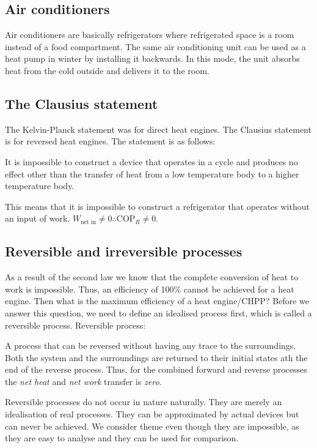 \documentclass[class=report, crop=false, 12pt,a4paper]{standalone}
\begin{document}
\subsection{Air conditioners}
Air conditioners are basically refrigerators where refrigerated space is a room instead of a food compartment. The same air conditioning unit can be used as a heat pump in winter by installing it backwards. In this mode, the unit absorbs heat from the cold outside and delivers it to the room.
\subsection{The Clausius statement}
The Kelvin-Planck statement was for direct heat engines. The Clausius statement is for reversed heat engines. The statement is as follows:
\begin{center}
  It is impossible to construct a device that operates in a cycle and produces no effect other than the transfer of heat from a low temperature body to a higher temperature body.
\end{center}
This means that it is impossible to construct a refrigerator that operates without an input of work. \(W_{\textrm{net in}} \neq 0 \therefore \textrm{COP}_R \neq 0\).
\subsection{Reversible and irreversible processes}
As a result of the second law we know that the complete conversion of heat to work is impossible. Thus, an efficiency of 100\% cannot be achieved for a heat engine. Then what is the maximum efficiency of a heat engine/CHPP? Before we answer this question, we need to define an idealised process first, which is called a reversible process.
Reversible process:
\begin{center}
  A process that can be reversed without having any trace to the surroundings. Both the system and the surroundings are returned to their initial states ath the end of the reverse process. Thus, for the combined forward and reverse processes the \emph{net heat} and \emph{net work} transfer is \emph{zero}.
\end{center}
Reversible processes do not occur in nature naturally. They are merely an idealisation of real processes. They can be approximated by actual devices but can never be achieved. We consider theme even though they are impossible, as they are easy to analyse and they can be used for comparison.
\end{document}
